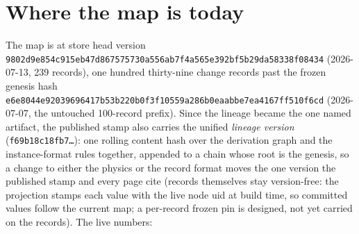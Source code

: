 \documentclass[11pt,a4paper]{article}
\begin{document}
\section{Where the map is today}
\label{sec:status-live}

The map is at store head version
\texttt{9802d9e854c915eb47d867575730a556ab7f4a565e392bf5b29da58338f08434}
(2026-07-13, 239 records), one hundred thirty-nine change records past the frozen genesis hash
\texttt{e6e8044e92039696417b53b220b0f3f10559a286b0eaabbe7ea4167ff510f6cd}
(2026-07-07, the untouched 100-record prefix). Since the lineage became the one
named artifact, the published stamp also carries the unified \emph{lineage
version} (\texttt{f69b18c18fb7\ldots}): one rolling content hash over the
derivation graph and the instance-format rules together, appended to a chain
whose root is the genesis, so a change to either the physics or the record
format moves the one version the published stamp and every page cite (records
themselves stay version-free: the projection stamps each value with the live
node uid at build time, so committed values follow the current map; a
per-record frozen pin is designed, not yet carried on the records). The live
numbers:
\end{document}
